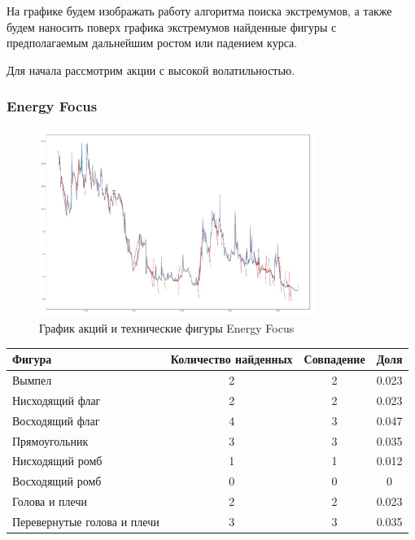 \documentclass[bachelor, och, coursework]{SCWorks}
\begin{document}
    На графике будем изображать работу алгоритма поиска экстремумов, а также
    будем наносить поверх графика экстремумов найденные фигуры с предполагаемым 
    дальнейшим ростом или падением курса.
    
    Для начала рассмотрим акции с высокой волатильностью.
    
    \subsubsection{Energy Focus}
    
    \begin{figure}[H]
        \centering
        \includegraphics[width=0.8\textwidth]{pic/EFOI.jpg}
        \caption{График акций и технические фигуры Energy Focus}
    \end{figure}
   
    \begin{table}[!hbt]
        \centering
        \begin{tabular}{|l|c|c|c|}
        \hline
        Фигура                      & \multicolumn{1}{l|}{Количество найденных} & Совпадение & Доля  \\ \hline
        Вымпел                      & 2                                         & 2          & 0.023 \\ \hline
        Нисходящий флаг             & 2                                         & 2          & 0.023 \\ \hline
        Восходящий флаг             & 4                                         & 3          & 0.047 \\ \hline
        Прямоугольник               & 3                                         & 3          & 0.035 \\ \hline
        Нисходящий ромб             & 1                                         & 1          & 0.012 \\ \hline
        Восходящий ромб             & 0                                         & 0          & 0     \\ \hline
        Голова и плечи              & 2                                         & 2          & 0.023 \\ \hline
        Перевернутые голова и плечи & 3                                         & 3          & 0.035 \\ \hline
        \end{tabular}
        \end{table}
\end{document}
